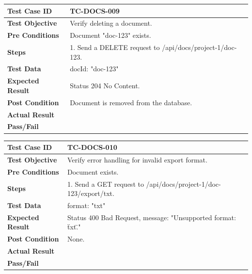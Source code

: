 \begin{longtable}{|p{}|p{}|}
\hline
\textbf{Test Case ID} & TC-DOCS-009 \\ \hline
\textbf{Test Objective} & Verify deleting a document. \\ \hline
\textbf{Pre Conditions} & Document "doc-123" exists. \\ \hline
\textbf{Steps} & 
1. Send a DELETE request to /api/docs/project-1/doc-123. \\ \hline
\textbf{Test Data} & docId: "doc-123" \\ \hline
\textbf{Expected Result} & Status 204 No Content. \\ \hline
\textbf{Post Condition} & Document is removed from the database. \\ \hline
\textbf{Actual Result} &  \\ \hline
\textbf{Pass/Fail} &  \\ \hline
\end{longtable}

\begin{longtable}{|p{}|p{}|}
\hline
\textbf{Test Case ID} & TC-DOCS-010 \\ \hline
\textbf{Test Objective} & Verify error handling for invalid export format. \\ \hline
\textbf{Pre Conditions} & Document exists. \\ \hline
\textbf{Steps} & 
1. Send a GET request to /api/docs/project-1/doc-123/export/txt. \\ \hline
\textbf{Test Data} & format: "txt" \\ \hline
\textbf{Expected Result} & Status 400 Bad Request, message: "Unsupported format: \"txt\"." \\ \hline
\textbf{Post Condition} & None. \\ \hline
\textbf{Actual Result} &  \\ \hline
\textbf{Pass/Fail} &  \\ \hline
\end{longtable}